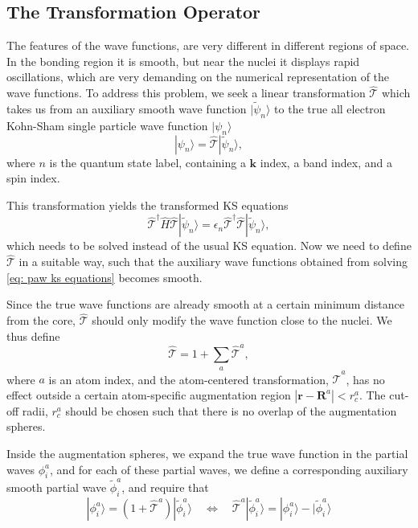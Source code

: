 \documentclass[a4paper]{article}
\newcommand{\f}[1]{\mathbf{#1}}
\newcommand{\s}[1]{\tilde{#1}}
\newcommand{\T}{\hat{\mathcal{T}}}
\newcommand{\Ham}{\widehat{H}}
\newcommand{\ket}[1]{| #1 \rangle}
\begin{document}
\subsection{The Transformation Operator}\label{sec: transformation operator}
The features of the wave functions, are very different in different
regions of space. In the bonding region it is smooth, but near the
nuclei it displays rapid oscillations, which are very demanding on the
numerical representation of the wave functions.  To address this
problem, we seek a linear transformation $\T$ which takes us from an
auxiliary smooth wave function $\ket{\s{\psi}_n}$ to the true all
electron Kohn-Sham single particle wave function $\ket{\psi_n}$
%
\begin{equation}
\ket{\psi_n}=\T\ket{\s{\psi}_n},
\end{equation}
%
where $n$ is the quantum state label, containing a $\f{k}$ index, a
band index, and a spin index.
\par This transformation yields the transformed KS equations
%
\begin{equation}\label{eq: paw ks equations}
\T^\dagger \Ham \T \ket{\s{\psi}_n}=\epsilon_n\T^\dagger\T\ket{\s{\psi}_n},
\end{equation}
%
which needs to be solved instead of the usual KS equation. Now we need
to define $\T$ in a suitable way, such that the auxiliary wave
functions obtained from solving \ref{eq: paw ks equations} becomes
smooth.
\par Since the true wave functions are already smooth at a certain
minimum distance from the core, $\T$ should only modify the wave
function close to the nuclei. We thus define
%
\begin{equation}
\T = 1 + \sum_a \T^a,
\end{equation}
%
where $a$ is an atom index, and the atom-centered transformation,
$\T^a$, has no effect outside a certain atom-specific augmentation
region $|\f{r}-\f{R}^a|<r_c^a$. The cut-off radii, $r_c^a$ should
be chosen such that there is no overlap of the augmentation
spheres.
\par Inside the augmentation spheres, we expand the true wave function in the partial waves
$\phi_i^a$, and for each of these partial waves, we define a
corresponding auxiliary smooth partial wave $\s{\phi}_i^a$, and
require that
%
\begin{equation}\label{eq: ta}
\ket{\phi_i^a}
=(1+\T^a)\ket{\s{\phi}_i^a}\quad\Leftrightarrow\quad
\T^a\ket{\s{\phi}_i^a} =\ket{\phi_i^a} - \ket{\s{\phi}_i^a}
\end{equation}
\end{document}
